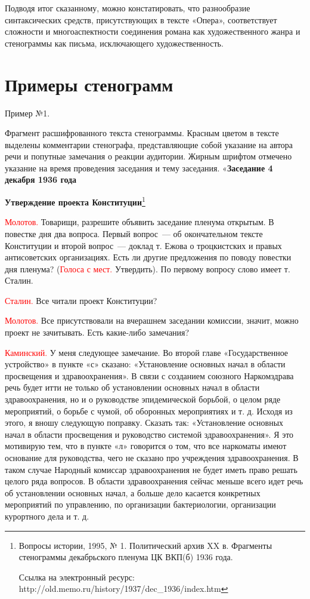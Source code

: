 \documentclass{kursa4}
\begin{document}
{  Подводя итог сказанному, можно констатировать, что разнообразие синтаксических средств, присутствующих в тексте «Опера», соответствует сложности и многоаспектности соединения романа как художественного жанра и стенограммы как письма, исключающего художественность.   

  


        \section*{Примеры стенограмм}

      Пример №1. 

      Фрагмент расшифрованного текста стенограммы. Красным цветом в тексте выделены комментарии стенографа, представляющие собой указание на автора речи и попутные замечания о реакции аудитории. Жирным шрифтом отмечено указание на время проведения заседания и тему заседания. «\textbf{{Заседание 4 декабря 1936 года}}

      \textbf{{Утверждение проекта Конституции}}\footnote{ Вопросы истории, 1995, № 1. Политический архив XX в. Фрагменты стенограммы декабрьского пленума ЦК ВКП(б) 1936 года.\par Ссылка на электронный ресурс: http://old.memo.ru/history/1937/dec\_1936/index.htm}

      \textcolor{red}{Молотов.}{
      Товарищи, разрешите объявить заседание пленума открытым. В повестке дня два вопроса. Первый вопрос~--- об окончательном тексте Конституции и второй вопрос~--- доклад т. Ежова о троцкистских и правых антисоветских организациях. Есть ли другие предложения по поводу повестки дня пленума? (}\textcolor{red}{Голоса с мест.}{ Утвердить). По первому вопросу слово имеет т. Сталин.}

      \textcolor{red}{Сталин.}{
      Все читали проект Конституции?}

      \textcolor{red}{Молотов.}{
      Все присутствовали на вчерашнем заседании комиссии, значит, можно проект не зачитывать. Есть какие-либо замечания?}

      \textcolor{red}{Каминский.}{
      У меня следующее замечание. Во второй главе «Государственное устройство» в пункте «с» сказано: «Установление основных начал в области просвещения и здравоохранения». В связи с созданием союзного Наркомздрава речь будет итти не только об установлении основных начал в области здравоохранения, но и о руководстве эпидемической борьбой, о целом ряде мероприятий, о борьбе с чумой, об оборонных мероприятиях и т. д. Исходя из этого, я вношу следующую поправку. Сказать так: «Установление основных начал в области просвещения и руководство системой здравоохранения». Я это мотивирую тем, что в пункте «л» говорится о том, что все наркоматы имеют основание для руководства, чего не сказано про учреждения здравоохранения. В таком случае Народный комиссар здравоохранения не будет иметь право решать целого ряда вопросов. В области здравоохранения сейчас меньше всего идет речь об установлении основных начал, а больше дело касается конкретных мероприятий по управлению, по организации бактериологии, организации курортного дела и т. д.}

}
\end{document}
